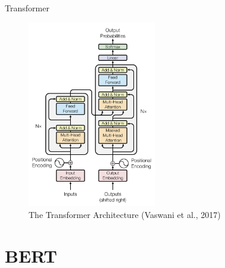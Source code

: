 \documentclass[10pt]{beamer}
\begin{document}
\begin{frame}{Transformer}

\begin{figure}[h]
\centering
\includegraphics[width=0.5\textwidth]{fig/Vaswani_1_transformer.png}
\caption{The Transformer Architecture (Vaswani et al., 2017)}
\end{figure}

\end{frame}



\section{BERT}
\end{document}
